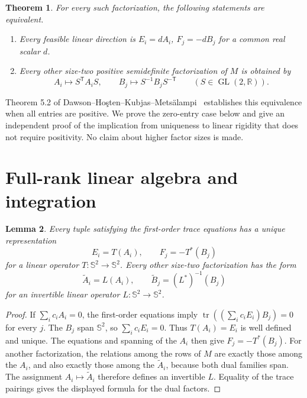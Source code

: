 \documentclass[11pt]{article}
\newtheorem{theorem}{Theorem}
\newtheorem{lemma}[theorem]{Lemma}
\newcommand{\Sym}{\mathbb S^2}
\newcommand{\tr}{\operatorname{tr}}
\newcommand{\GL}{\operatorname{GL}}
\begin{document}
\begin{theorem}\label{thm:main}
For every such factorization, the following statements are equivalent.
\begin{enumerate}
\item Every feasible linear direction is $E_i=dA_i$, $F_j=-dB_j$ for a common real scalar $d$.
\item Every other size-two positive semidefinite factorization of $M$ is obtained by
\[
 A_i\mapsto S^{\mathsf T}A_iS,
 \qquad B_j\mapsto S^{-1}B_jS^{-\mathsf T}
 \qquad(S\in\GL(2,\mathbb R)).
\]
\end{enumerate}
\end{theorem}
Theorem 5.2 of Dawson--Ho\c{s}ten--Kubjas--Mets\"alampi~\cite{dhkm} establishes this equivalence when all entries are positive. We prove the zero-entry case below and give an independent proof of the implication from uniqueness to linear rigidity that does not require positivity. No claim about higher factor sizes is made.

\section{Full-rank linear algebra and integration}
\begin{lemma}\label{lem:operator}
Every tuple satisfying the first-order trace equations has a unique representation
\[
 E_i=T(A_i),\qquad F_j=-T^*(B_j)
\]
for a linear operator $T:\Sym\to\Sym$.
Every other size-two factorization has the form
\[
 \widetilde A_i=L(A_i),\qquad
 \widetilde B_j=(L^*)^{-1}(B_j)
\]
for an invertible linear operator $L:\Sym\to\Sym$.
\end{lemma}
\begin{proof}
If $\sum_i c_i A_i=0$, the first-order equations imply
$\tr((\sum_i c_iE_i)B_j)=0$ for every $j$. The $B_j$ span $\Sym$, so $\sum_i c_iE_i=0$. Thus $T(A_i)=E_i$ is well defined and unique. The equations and spanning of the $A_i$ then give $F_j=-T^*(B_j)$.
For another factorization, the relations among the rows of $M$ are exactly those among the $A_i$, and also exactly those among the $\widetilde A_i$, because both dual families span. The assignment $A_i\mapsto\widetilde A_i$ therefore defines an invertible $L$. Equality of the trace pairings gives the displayed formula for the dual factors.
\end{proof}
\end{document}
